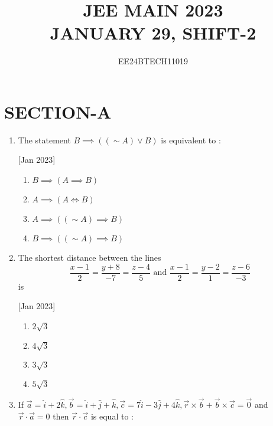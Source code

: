 \documentclass[journal,12pt,twocolumn]{IEEEtran}
\theoremstyle{remark}
\begin{document}

\vspace{3cm}

\title{\textbf{JEE MAIN 2023\\JANUARY 29, SHIFT-2}}
\author{EE24BTECH11019}
\maketitle
\newpage
\bigskip

\renewcommand{\thefigure}{\theenumi}
\renewcommand{\thetable}{\theenumi}

\section*{\textbf{SECTION-A}}
\bigskip

\begin{enumerate}
    \item The statement $B\implies((\sim A)\lor B)$ is equivalent to :
    
    \hfill[Jan 2023]
        \begin{enumerate}
            \item $B\implies(A \implies B)$
            \item $A \implies(A \iff B)$
            \item $A \implies((\sim A)\implies B)$
            \item $B \implies((\sim A)\implies B)$
        \end{enumerate}
    
    \item The shortest distance between the lines $$\frac{x-1}{2}=\frac{y+8}{-7}=\frac{z-4}{5} \text{ and } \frac{x-1}{2}=\frac{y-2}{1}=\frac{z-6}{-3}$$ is
    
    \hfill[Jan 2023]
        \begin{enumerate}
            \item $2\sqrt{3}$
            \item $4\sqrt{3}$
            \item $3\sqrt{3}$
            \item $5\sqrt{3}$
        \end{enumerate}
    
    \item If $\vec{a}=\hat{i}+2\hat{k},\vec{b}=\hat{i}+\hat{j}+\hat{k},\vec{c}=7\hat{i}-3\hat{j}+4\hat{k},\vec{r}\times\vec{b}+\vec{b}\times\vec{c}=\vec{0}$ and $\vec{r}\cdot\vec{a}=0$ then $\vec{r}\cdot\vec{c}$ is equal to :
    

\end{enumerate}
\end{document}
